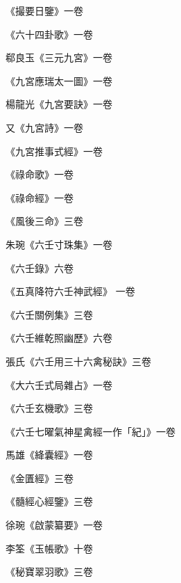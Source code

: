 \begin{pinyinscope}
 《撮要日鑒》一卷



 《六十四卦歌》一卷



 郗良玉《三元九宮》一卷



 《九宮應瑞太一圖》一卷



 楊龍光《九宮要訣》一卷



 又《九宮詩》一卷



 《九宮推事式經》一卷



 《祿命歌》一卷



 《祿命經》一卷



 《風後三命》三卷



 朱琬《六壬寸珠集》一卷



 《六壬錄》六卷



 《五真降符六壬神武經》
 一卷



 《六壬關例集》三卷



 《六壬維乾照幽歷》六卷



 張氏《六壬用三十六禽秘訣》三卷



 《大六壬式局雜占》一卷



 《六壬玄機歌》三卷



 《六壬七曜氣神星禽經一作「紀」》一卷



 馬雄《絳囊經》一卷



 《金匱經》三卷



 《髓經心經鑒》三卷



 徐琬《啟蒙纂要》一卷



 李筌《玉帳歌》十卷



 《秘寶翠羽歌》三卷




\end{pinyinscope}
